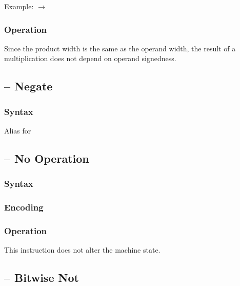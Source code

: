 \documentclass[a4paper,12pt,twoside,extrafontsizes]{memoir}
\begin{document}
{

Example:  $\rightarrow$ 

\subsubsection{Operation}


Since the product width is the same as the operand width, the result of a multiplication does not depend on operand signedness.

\subsection{ -- Negate}
\label{subsec:instr:neg}

\subsubsection{Syntax}


Alias for 

\subsection{ -- No Operation}
\label{subsec:instr:nop}

\subsubsection{Syntax}


\subsubsection{Encoding}


\subsubsection{Operation}

This instruction does not alter the machine state.

\subsection{ -- Bitwise Not}
\label{subsec:instr:not}

}
\end{document}
